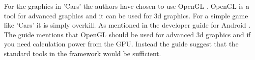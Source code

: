 For the graphics in 'Cars' the authors have chosen to use OpenGL \cite{opengl}.
OpenGL is a tool for advanced graphics and it can be used for 3d graphics.
For a simple game like 'Cars' it is simply overkill.
As mentioned in the developer guide for Android \cite{android_opengl}.
The guide mentions that OpenGL should be used for advanced 3d graphics and if you need calculation power from the GPU.
Instead the guide suggest that the standard tools in the framework would be sufficient.
